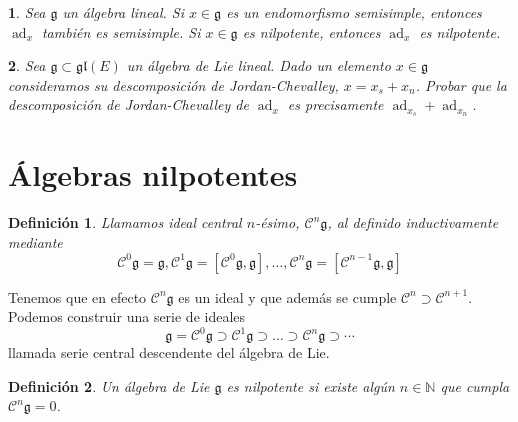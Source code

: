 \documentclass[a4paper,draft,12pt]{article}
\newtheorem{defi}{Definición}[section]%
\newtheorem{pro1}{}%
\newenvironment{pro}{\begin{pro1} \rm} {\end{pro1}}
\newcommand{\N}{\mathbb{N}}%
\newcommand{\g}{\mathfrak{g}}%
\newcommand{\central}{\mathcal{C}}%
\newcommand{\df}[1]{\textsf{\color{blue}#1}}
\DeclareMathOperator{\ad}{ad}  %
\begin{document}
\begin{pro}

Sea  $\g$ un álgebra lineal. Si $x\in \g$ es un endomorfismo semisimple, entonces $\ad_x$ también es semisimple.
Si $x\in \g$ es nilpotente, entonces $\ad_x$ es nilpotente.

\end{pro}




\begin{pro}

Sea $\g \subset \mathfrak{gl}(E)$ un  álgebra de Lie lineal.  Dado un elemento $x \in \g$ consideramos su descomposición de Jordan-Chevalley, $x= x_s+x_n$.  Probar que la descomposición de Jordan-Chevalley de $\ad_x$ es precisamente $\ad_{x_s}+ \ad_{x_n}$.

\end{pro}

\newpage

\section{Álgebras nilpotentes}

\begin{defi}

Llamamos  \df{ideal central}  $n$-ésimo, $\central^n \g$, al definido inductivamente mediante
$$
\central^0\g=\g, \central^1\g =[\central^0\g,\g], \dots, \central^n \g= [\central^{n-1}\g,\g]
$$

\end{defi}

Tenemos que en efecto $\central^n \g$ es un ideal y que además se cumple $\central^n \supset \central^{n+1}$.  Podemos construir una serie de ideales
$$
\g = \central^0\g\supset \central^1 \g \supset \dots \supset \central^n\g\supset \cdots
$$
llamada  \df{serie central descendente}  del álgebra de Lie.




\begin{defi}

Un álgebra de Lie $\g$ es nilpotente  si existe algún $n \in \N$ que cumpla $\central^n\g=0$. 

\end{defi}


\end{document}
